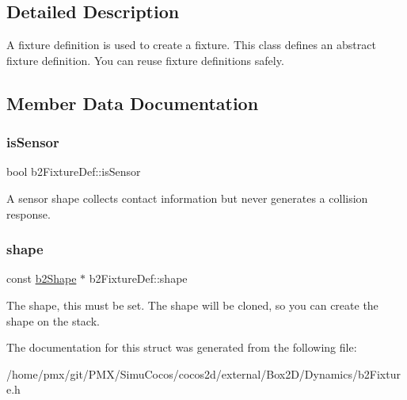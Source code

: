 \subsection{Detailed Description}
A fixture definition is used to create a fixture. This class defines an abstract fixture definition. You can reuse fixture definitions safely. 

\subsection{Member Data Documentation}
\mbox{\label{structb2FixtureDef_ac8cfcc6208663c92861eaab3b3fdc57e}} 
\subsubsection{\texorpdfstring{is\+Sensor}{isSensor}}
{\footnotesize\ttfamily bool b2\+Fixture\+Def\+::is\+Sensor}

A sensor shape collects contact information but never generates a collision response. \mbox{\label{structb2FixtureDef_afd5c15e1a391333566b0e241ed9e9edf}} 
\subsubsection{\texorpdfstring{shape}{shape}}
{\footnotesize\ttfamily const \hyperlink{classb2Shape}{b2\+Shape} $\ast$ b2\+Fixture\+Def\+::shape}

The shape, this must be set. The shape will be cloned, so you can create the shape on the stack. 

The documentation for this struct was generated from the following file\+:\begin{DoxyCompactItemize}
\item 
/home/pmx/git/\+P\+M\+X/\+Simu\+Cocos/cocos2d/external/\+Box2\+D/\+Dynamics/b2\+Fixture.\+h\end{DoxyCompactItemize}
